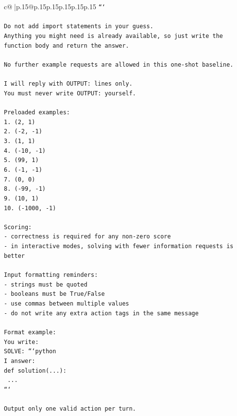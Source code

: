 \documentclass{article}
\begin{document}
{\begin{supertabular}{c@{$\;$}|p{.15\linewidth}@{}p{.15\linewidth}p{.15\linewidth}p{.15\linewidth}p{.15\linewidth}p{.15\linewidth}}
{{{\texttt{```} \\
\\ 
\texttt{Do not add import statements in your guess.} \\
\texttt{Anything you might need is already available, so just write the function body and return the answer.} \\
\\ 
\texttt{No further example requests are allowed in this one{-}shot baseline.} \\
\\ 
\texttt{I will reply with OUTPUT: lines only.} \\
\texttt{You must never write OUTPUT: yourself.} \\
\\ 
\texttt{Preloaded examples:} \\
\texttt{1. (2, 1)} \\
\texttt{2. ({-}2, {-}1)} \\
\texttt{3. (1, 1)} \\
\texttt{4. ({-}10, {-}1)} \\
\texttt{5. (99, 1)} \\
\texttt{6. ({-}1, {-}1)} \\
\texttt{7. (0, 0)} \\
\texttt{8. ({-}99, {-}1)} \\
\texttt{9. (10, 1)} \\
\texttt{10. ({-}1000, {-}1)} \\
\\ 
\texttt{Scoring:} \\
\texttt{{-} correctness is required for any non{-}zero score} \\
\texttt{{-} in interactive modes, solving with fewer information requests is better} \\
\\ 
\texttt{Input formatting reminders:} \\
\texttt{{-} strings must be quoted} \\
\texttt{{-} booleans must be True/False} \\
\texttt{{-} use commas between multiple values} \\
\texttt{{-} do not write any extra action tags in the same message} \\
\\ 
\texttt{Format example:} \\
\texttt{You write:} \\
\texttt{SOLVE: ```python} \\
\texttt{I answer:} \\
\texttt{def solution(...):} \\
\texttt{    ...} \\
\texttt{```} \\
\\ 
\texttt{Output only one valid action per turn.} \\
            }
        }
    }
     \\ \\


\end{supertabular}}
\end{document}
